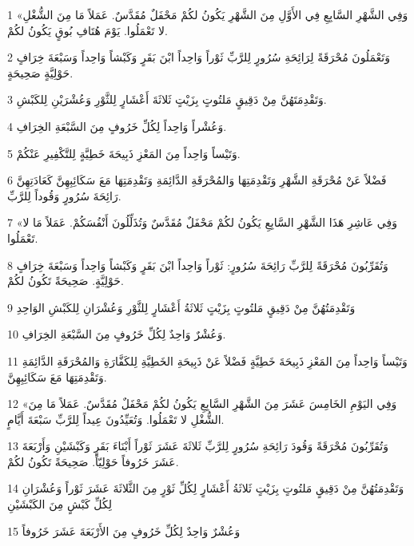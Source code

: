 \par 1 «وَفِي الشَّهْرِ السَّابِعِ فِي الأَوَّلِ مِنَ الشَّهْرِ يَكُونُ لكُمْ مَحْفَلٌ مُقَدَّسٌ. عَمَلاً مَا مِنَ الشُّغْلِ لا تَعْمَلُوا. يَوْمَ هُتَافِ بُوقٍ يَكُونُ لكُمْ.
\par 2 وَتَعْمَلُونَ مُحْرَقَةً لِرَائِحَةِ سُرُورٍ لِلرَّبِّ ثَوْراً وَاحِداً ابْنَ بَقَرٍ وَكَبْشاً وَاحِداً وَسَبْعَةَ خِرَافٍ حَوْلِيَّةٍ صَحِيحَةٍ.
\par 3 وَتَقْدِمَتَهُنَّ مِنْ دَقِيقٍ مَلتُوتٍ بِزَيْتٍ ثَلاثَةَ أَعْشَارٍ لِلثَّوْرِ وَعُشْرَيْنِ لِلكَبْشِ.
\par 4 وَعُشْراً وَاحِداً لِكُلِّ خَرُوفٍ مِنَ السَّبْعَةِ الخِرَافِ.
\par 5 وَتَيْساً وَاحِداً مِنَ المَعْزِ ذَبِيحَةَ خَطِيَّةٍ لِلتَّكْفِيرِ عَنْكُمْ.
\par 6 فَضْلاً عَنْ مُحْرَقَةِ الشَّهْرِ وَتَقْدِمَتِهَا وَالمُحْرَقَةِ الدَّائِمَةِ وَتَقْدِمَتِهَا مَعَ سَكَائِبِهِنَّ كَعَادَتِهِنَّ رَائِحَةَ سُرُورٍ وَقُوداً لِلرَّبِّ.
\par 7 «وَفِي عَاشِرِ هَذَا الشَّهْرِ السَّابِعِ يَكُونُ لكُمْ مَحْفَلٌ مُقَدَّسٌ وَتُذَلِّلُونَ أَنْفُسَكُمْ. عَمَلاً مَا لا تَعْمَلُوا.
\par 8 وَتُقَرِّبُونَ مُحْرَقَةً لِلرَّبِّ رَائِحَةَ سُرُورٍ: ثَوْراً وَاحِداً ابْنَ بَقَرٍ وَكَبْشاً وَاحِداً وَسَبْعَةَ خِرَافٍ حَوْلِيَّةٍ. صَحِيحَةً تَكُونُ لكُمْ.
\par 9 وَتَقْدِمَتُهُنَّ مِنْ دَقِيقٍ مَلتُوتٍ بِزَيْتٍ ثَلاثَةُ أَعْشَارٍ لِلثَّوْرِ وَعُشْرَانِ لِلكَبْشِ الوَاحِدِ
\par 10 وَعُشْرٌ وَاحِدٌ لِكُلِّ خَرُوفٍ مِنَ السَّبْعَةِ الخِرَافِ.
\par 11 وَتَيْساً وَاحِداً مِنَ المَعْزِ ذَبِيحَةَ خَطِيَّةٍ فَضْلاً عَنْ ذَبِيحَةِ الخَطِيَّةِ لِلكَفَّارَةِ وَالمُحْرَقَةِ الدَّائِمَةِ وَتَقْدِمَتِهَا مَعَ سَكَائِبِهِنَّ.
\par 12 «وَفِي اليَوْمِ الخَامِسَ عَشَرَ مِنَ الشَّهْرِ السَّابِعِ يَكُونُ لكُمْ مَحْفَلٌ مُقَدَّسٌ. عَمَلاً مَا مِنَ الشُّغْلِ لا تَعْمَلُوا. وَتُعَيِّدُونَ عِيداً لِلرَّبِّ سَبْعَةَ أَيَّامٍ.
\par 13 وَتُقَرِّبُونَ مُحْرَقَةً وَقُودَ رَائِحَةِ سُرُورٍ لِلرَّبِّ ثَلاثَةَ عَشَرَ ثَوْراً أَبْنَاءَ بَقَرٍ وَكَبْشَيْنِ وَأَرْبَعَةَ عَشَرَ خَرُوفاً حَوْلِيّاً. صَحِيحَةً تَكُونُ لكُمْ.
\par 14 وَتَقْدِمَتُهُنَّ مِنْ دَقِيقٍ مَلتُوتٍ بِزَيْتٍ ثَلاثَةُ أَعْشَارٍ لِكُلِّ ثَوْرٍ مِنَ الثَّلاثَةَ عَشَرَ ثَوْراً وَعُشْرَانِ لِكُلِّ كَبْشٍ مِنَ الكَبْشَيْنِ
\par 15 وَعُشْرٌ وَاحِدٌ لِكُلِّ خَرُوفٍ مِنَ الأَرْبَعَةَ عَشَرَ خَرُوفاً
